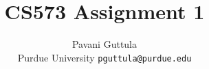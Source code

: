 \documentclass[preprint,9pt]{article}
\date{}
\begin{document}
\title{CS573 Assignment 1}

\author{Pavani Guttula\\ \small{Purdue University} \hspace*{0.1in}
  \small{{\tt pguttula@purdue.edu}} }

\maketitle




{
}
\end{document}
